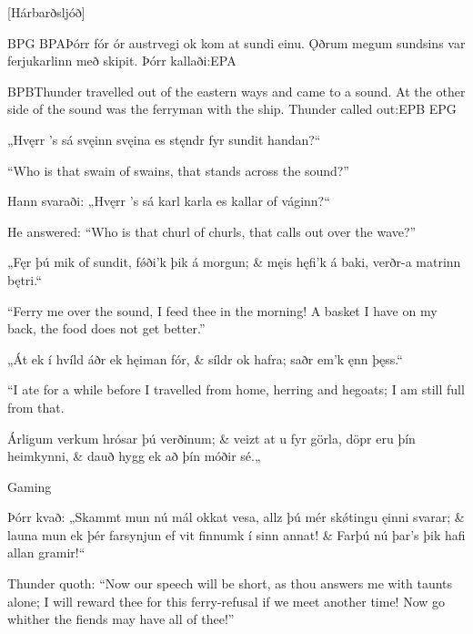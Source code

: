 [Hárbarðsljóð]

BPG
BPAÞórr fór ór austrvegi ok kom at sundi einu. Ǫðrum megum sundsins var ferjukarlinn með skipit. Þórr kallaði:EPA

BPBThunder travelled out of the eastern ways and came to a sound. At the other side of the sound was the ferryman with the ship. Thunder called out:EPB
EPG

\bvg
\bva „Hvęrr ’s sá svęinn svęina \hld es stęndr fyr sundit handan?“\eva

\bvb “Who is that swain of swains, that stands across the sound?”\evb
\evg


\bvg
\bva Hann svaraði:
„Hvęrr ’s sá karl karla \hld es kallar of váginn?“\eva

\bvb He answered:
“Who is that churl of churls, that calls out over the wave?”\evb
\evg


\bvg
\bva „Fęr þú mik of sundit, \hld fǿði’k þik á morgun; &
męis hęfi’k á baki, \hld verðr-a matrinn bętri.“\eva

\bvb [Thunder:]
“Ferry me over the sound, I feed thee in the morning! A basket I have on my back, the food does not get better.”\evb
\evg


\bvg
\bva „Át ek í hvíld \hld áðr ek hęiman fór, &
síldr ok hafra; \hld saðr em’k ęnn þęss.“\eva

\bvb [Ferryman:]
“I ate for a while before I travelled from home, herring and hegoats; I am still full from that.\evb
\evg


\bvg
\bva Árligum verkum \hld hrósar þú verðinum; &
veizt at u fyr görla, \hld döpr eru þín heimkynni, &
dauð hygg ek að þín móðir sé.„\eva

\bvb Gaming\evb
\evg


\bvg Þórr kvað:
\bva „Skammt mun nú mál okkat vesa, \hld allz þú mér skǿtingu ęinni svarar; &
launa mun ek þér farsynjun \hld ef vit finnumk í sinn annat! &
\ind Farþú nú þar’s þik hafi allan gramir!“\eva

\bvb Thunder quoth:
“Now our speech will be short, as thou answers me with taunts alone; I will reward thee for this ferry-refusal if we meet another time! Now go whither the fiends may have all of thee!”\evb
\evg
